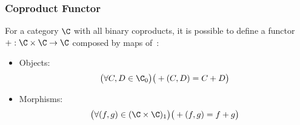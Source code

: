 \subsubsection{Coproduct Functor}
  \begin{definition}
    For a category $\C$ with all binary coproducts, it is possible to define a
    functor $+:\C\times \C \to \C$ composed by maps
    of~\parencite[p.~61]{awodey:category_theory}:
    \begin{itemize}
      \item Objects:
        \[\big(\forall C,D\in \C_0\big)
          \big(+(C, D) = C+D\big)\]
      \item Morphisms:
        \[\big(\forall (f, g)\in (\C\times \C)_1\big)
          \big(+(f, g) = f+ g\big)\]
    \end{itemize}
  \end{definition}

